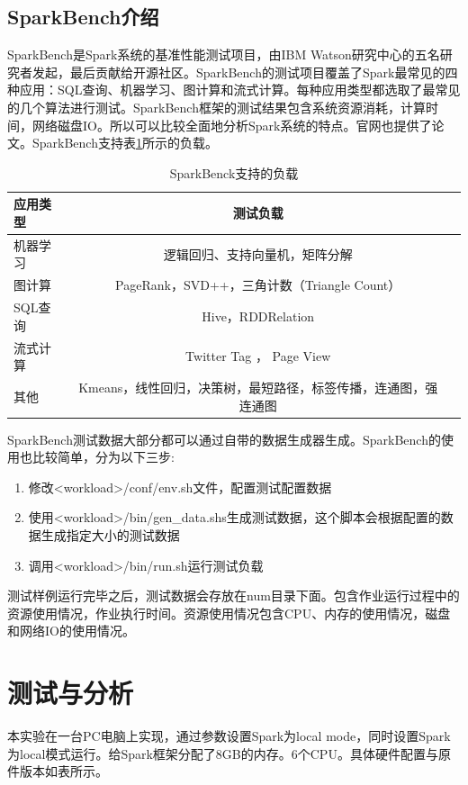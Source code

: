 \subsection{SparkBench介绍}

SparkBench是Spark系统的基准性能测试项目，由IBM Watson研究中心的五名研究者发起，最后贡献给开源社区。SparkBench的测试项目覆盖了Spark最常见的四种应用：SQL查询、机器学习、图计算和流式计算。每种应用类型都选取了最常见的几个算法进行测试。SparkBench框架的测试结果包含系统资源消耗，计算时间，网络磁盘IO。所以可以比较全面地分析Spark系统的特点。官网也提供了论文。SparkBench支持表\ref{tab:workload}所示的负载。

\begin{table}
 \caption{SparkBenck支持的负载}
 \label{tab:workload}
 \begin{tabular}{lcl}
  \toprule
  应用类型 & 测试负载 \\
  \midrule
  机器学习 & 逻辑回归、支持向量机，矩阵分解  \\
  图计算 &  PageRank，SVD++，三角计数（Triangle Count） \\
  SQL查询 & Hive，RDDRelation  \\
  流式计算 & Twitter Tag ， Page View  \\
  其他 &  Kmeans，线性回归，决策树，最短路径，标签传播，连通图，强连通图 \\
  \bottomrule
 \end{tabular}
\end{table}

SparkBench测试数据大部分都可以通过自带的数据生成器生成。SparkBench的使用也比较简单，分为以下三步:

\begin{enumerate}
    \item 修改<workload>/conf/env.sh文件，配置测试配置数据
    \item 使用<workload>/bin/gen\_data.shs生成测试数据，这个脚本会根据配置的数据生成指定大小的测试数据
    \item 调用<workload>/bin/run.sh运行测试负载
\end{enumerate}

测试样例运行完毕之后，测试数据会存放在num目录下面。包含作业运行过程中的资源使用情况，作业执行时间。资源使用情况包含CPU、内存的使用情况，磁盘和网络IO的使用情况。

\section{测试与分析}

本实验在一台PC电脑上实现，通过参数设置Spark为local mode，同时设置Spark为local模式运行。给Spark框架分配了8GB的内存。6个CPU。具体硬件配置与原件版本如表所示。

